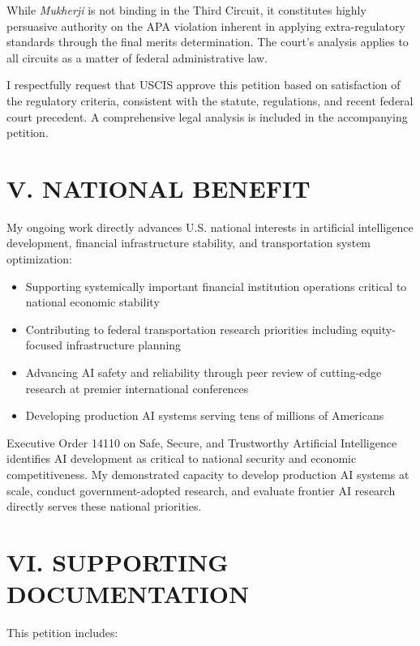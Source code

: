 \documentclass[11pt]{article}
\begin{document}
While \textit{Mukherji} is not binding in the Third Circuit, it constitutes highly persuasive authority on the APA violation inherent in applying extra-regulatory standards through the final merits determination. The court's analysis applies to all circuits as a matter of federal administrative law.

I respectfully request that USCIS approve this petition based on satisfaction of the regulatory criteria, consistent with the statute, regulations, and recent federal court precedent. A comprehensive legal analysis is included in the accompanying petition.

\section*{V. NATIONAL BENEFIT}

My ongoing work directly advances U.S. national interests in artificial intelligence development, financial infrastructure stability, and transportation system optimization:

\begin{itemize}
    \item Supporting systemically important financial institution operations critical to national economic stability
    \item Contributing to federal transportation research priorities including equity-focused infrastructure planning
    \item Advancing AI safety and reliability through peer review of cutting-edge research at premier international conferences
    \item Developing production AI systems serving tens of millions of Americans
\end{itemize}

Executive Order 14110 on Safe, Secure, and Trustworthy Artificial Intelligence identifies AI development as critical to national security and economic competitiveness. My demonstrated capacity to develop production AI systems at scale, conduct government-adopted research, and evaluate frontier AI research directly serves these national priorities.

\section*{VI. SUPPORTING DOCUMENTATION}

This petition includes:
\end{document}
